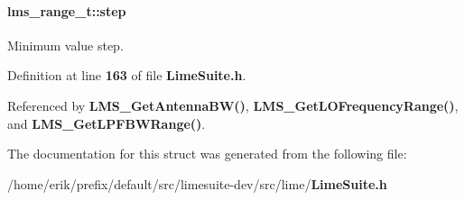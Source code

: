 \paragraph[{step}]{ lms\+\_\+range\+\_\+t\+::step}\label{structlms__range__t_a8ec6b2a96f23e96c6bd9211d366db0ba}


Minimum value step. 



Definition at line {\bf 163} of file {\bf Lime\+Suite.\+h}.



Referenced by {\bf L\+M\+S\+\_\+\+Get\+Antenna\+B\+W()}, {\bf L\+M\+S\+\_\+\+Get\+L\+O\+Frequency\+Range()}, and {\bf L\+M\+S\+\_\+\+Get\+L\+P\+F\+B\+W\+Range()}.



The documentation for this struct was generated from the following file\+:\begin{DoxyCompactItemize}
\item 
/home/erik/prefix/default/src/limesuite-\/dev/src/lime/{\bf Lime\+Suite.\+h}\end{DoxyCompactItemize}
